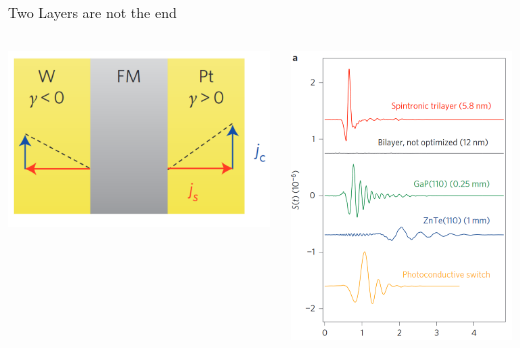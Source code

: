 \documentclass[aspectratio=1610, 9pt]{beamer}
\begin{document}
\begin{frame}{Two Layers are not the end}
  \begin{center}
  \begin{columns}
    \begin{column}{0.5\textwidth}
      \begin{center}
        \includegraphics[width=.8\textwidth]{pics/trilayer.png}
      \end{center}
    \end{column}
    \begin{column}{.5\textwidth}
      \begin{center}
        \includegraphics[width=.6\textwidth]{pics/vergleich.png}
      \end{center}
    \end{column}
  \end{columns}
\end{center}
\end{frame}
\end{document}
